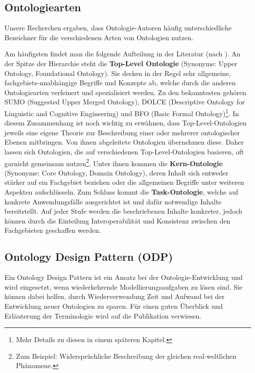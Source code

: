 \documentclass{article}
\begin{document}
\subsection{Ontologiearten}

Unsere Recherchen ergaben, dass Ontologie-Autoren häufig unterschiedliche Bezeichner für die verschiedenen Arten von Ontologien nutzen.

Am häufigsten findet man die folgende Aufteilung in der Literatur (nach \cite{hoehndorf2009developing}). An der Spitze der Hierarchie steht die \textbf{Top-Level Ontologie} (Synonyme: Upper Ontology, Foundational Ontology).
Sie decken in der Regel sehr allgemeine, fachgebiets-unabhängige Begriffe und Konzepte ab, welche durch die anderen Ontologiearten verfeinert und spezialisiert werden.
Zu den bekanntesten gehören SUMO (Suggested Upper Merged Ontology), DOLCE (Descriptive Ontology for Linguistic and Cognitive Engineering) und BFO (Basic Formal Ontology)\footnote{Mehr Details zu diesen in einem späteren Kapitel.}.
In diesem Zusammenhang ist noch wichtig zu erwähnen, dass Top-Level-Ontologien jeweils eine eigene Theorie zur Beschreibung einer oder mehrerer ontologischer Ebenen mitbringen.
Von ihnen abgeleitete Ontologien übernehmen diese.
Daher lassen sich Ontologien, die auf verschiedenen Top-Level-Ontologien basieren, oft garnicht gemeinsam nutzen\footnote{Zum Beispiel: Widersprüchliche Beschreibung der gleichen real-weltlichen Phänomene.}.
Unter ihnen kommen die \textbf{Kern-Ontologie} (Synonyme: Core Ontology, Domain Ontology), deren Inhalt sich entweder stärker auf ein Fachgebiet beziehen oder die allgemeinen Begriffe unter weiteren Aspekten aufschlüsseln.
Zum Schluss kommt die \textbf{Task-Ontologie}, welche auf konkrete Anwendungsfälle ausgerichtet ist und dafür notwendige Inhalte bereitstellt.
Auf jeder Stufe werden die beschriebenen Inhalte konkreter, jedoch können durch die Einteilung Interoperabilität und Konsistenz zwischen den Fachgebieten geschaffen werden.

\subsection{Ontology Design Pattern (ODP)}


Ein Ontology Design Pattern ist ein Ansatz bei der Ontologie-Entwicklung und wird eingesetzt, wenn wiederkehrende Modellierungsaufgaben zu lösen sind.
Sie können dabei helfen, durch Wiederverwendung Zeit und Aufwand bei der Entwicklung neuer Ontologien zu sparen.
Für einen guten Überblick und Erläuterung der Terminologie wird auf die Publikation \cite{falbo2013ontology} verwiesen.
\end{document}
